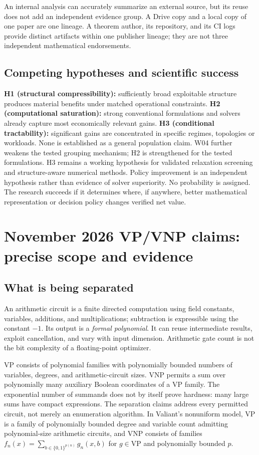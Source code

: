 \documentclass[11pt,letterpaper]{article}
\begin{document}
An internal analysis can accurately summarize an external source, but its reuse does not add an independent evidence group. A Drive copy and a local copy of one paper are one lineage. A theorem author, its repository, and its CI logs provide distinct artifacts within one publisher lineage; they are not three independent mathematical endorsements.

\subsection{Competing hypotheses and scientific success}
\textbf{H1 (structural compressibility):} sufficiently broad exploitable structure produces material benefits under matched operational constraints. \textbf{H2 (computational saturation):} strong conventional formulations and solvers already capture most economically relevant gains. \textbf{H3 (conditional tractability):} significant gains are concentrated in specific regimes, topologies or workloads. None is established as a general population claim. W04 further weakens the tested grouping mechanism; H2 is strengthened for the tested formulations. H3 remains a working hypothesis for validated relaxation screening and structure-aware numerical methods. Policy improvement is an independent hypothesis rather than evidence of solver superiority. No probability is assigned. The research succeeds if it determines where, if anywhere, better mathematical representation or decision policy changes verified net value.

\section{November 2026 VP/VNP claims: precise scope and evidence}
\label{sec:vp}
\subsection{What is being separated}
An arithmetic circuit is a finite directed computation using field constants, variables, additions, and multiplications; subtraction is expressible using the constant $-1$. Its output is a \emph{formal polynomial}. It can reuse intermediate results, exploit cancellation, and vary with input dimension. Arithmetic gate count is not the bit complexity of a floating-point optimizer.

VP consists of polynomial families with polynomially bounded numbers of variables, degrees, and arithmetic-circuit sizes. VNP permits a sum over polynomially many auxiliary Boolean coordinates of a VP family. The exponential number of summands does not by itself prove hardness: many large sums have compact expressions. The separation claims address every permitted circuit, not merely an enumeration algorithm. In Valiant's nonuniform model, VP is a family of polynomially bounded degree and variable count admitting polynomial-size arithmetic circuits, and VNP consists of families $f_n(x)=\sum_{b\in\{0,1\}^{p(n)}}g_n(x,b)$ for $g\in\mathrm{VP}$ and polynomially bounded $p$.\cite{valiant}
\end{document}

